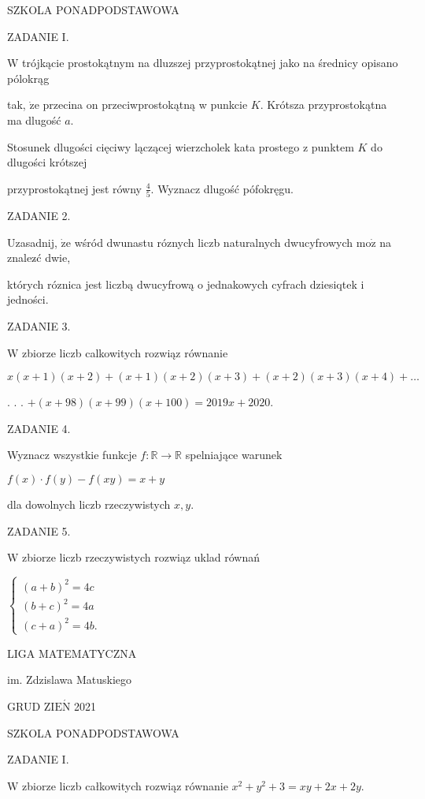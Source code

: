 \documentclass[a4paper,12pt]{article}
\begin{document}
SZKOLA PONADPODSTAWOWA

ZADANIE I.

$\mathrm{W}$ trójkącie prostokątnym na dluzszej przyprostokątnej jako na średnicy opisano pólokrąg

tak, $\dot{\mathrm{z}}\mathrm{e}$ przecina on przeciwprostokątną w punkcie $K$. Krótsza przyprostokątna ma dlugość $a.$

Stosunek dlugości cięciwy lączącej wierzcholek kata prostego z punktem $K$ do dlugości krótszej

przyprostokątnej jest równy $\displaystyle \frac{4}{5}$. Wyznacz dlugość pófokręgu.

ZADANIE 2.

Uzasadnij, $\dot{\mathrm{z}}\mathrm{e}$ wśród dwunastu róznych liczb naturalnych dwucyfrowych $\mathrm{m}\mathrm{o}\dot{\mathrm{z}}$ na znalez$\acute{}$ć dwie,

których róznica jest liczbą dwucyfrową o jednakowych cyfrach dziesiqtek i jedności.

ZADANIE 3.

$\mathrm{W}$ zbiorze liczb calkowitych rozwiąz równanie

$ x(x+1)(x+2)+(x+1)(x+2)(x+3)+(x+2)(x+3)(x+4)+\ldots$

. . . $+(x+98)(x+99)(x+100)=2019x+2020.$

ZADANIE 4.

Wyznacz wszystkie funkcje $f:\mathbb{R}\rightarrow \mathbb{R}$ spelniające warunek

$f(x)\cdot f(y)-f(xy)=x+y$

dla dowolnych liczb rzeczywistych $x, y.$

ZADANIE 5.

$\mathrm{W}$ zbiorze liczb rzeczywistych rozwiąz uklad równań

$\left\{\begin{array}{l}
(a+b)^{2}=4c\\
(b+c)^{2}=4a\\
(c+a)^{2}=4b.
\end{array}\right.$






LIGA MATEMATYCZNA

im. Zdzislawa Matuskiego

GRUD Z$\mathrm{I}\mathrm{E}\acute{\mathrm{N}}$ 2021

SZKOLA PONADPODSTAWOWA

ZADANIE I.

$\mathrm{W}$ zbiorze liczb całkowitych rozwiąz równanie $x^{2}+y^{2}+3=xy+2x+2y.$
\end{document}
